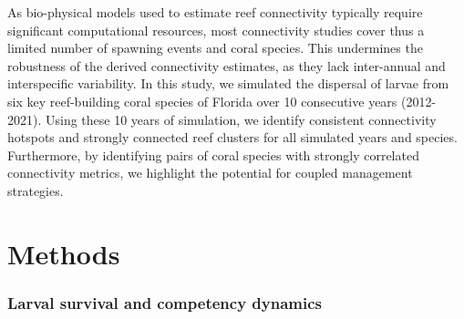 \documentclass[preprint,12pt,authoryear]{elsarticle}
\begin{document}
As bio-physical models used to estimate reef connectivity typically require significant computational resources, most connectivity studies cover thus a limited number of spawning events and coral species. This undermines the robustness of the derived connectivity estimates, as they lack inter-annual and interspecific variability. In this study, we simulated the dispersal of larvae from six key reef-building coral species of Florida over 10 consecutive years (2012-2021). Using these 10 years of simulation, we identify consistent connectivity hotspots and strongly connected reef clusters for all simulated years and species. Furthermore, by identifying pairs of coral species with strongly correlated connectivity metrics, we highlight the potential for coupled management strategies.


\section*{Methods}

\subsubsection*{Larval survival and competency dynamics}
\end{document}

